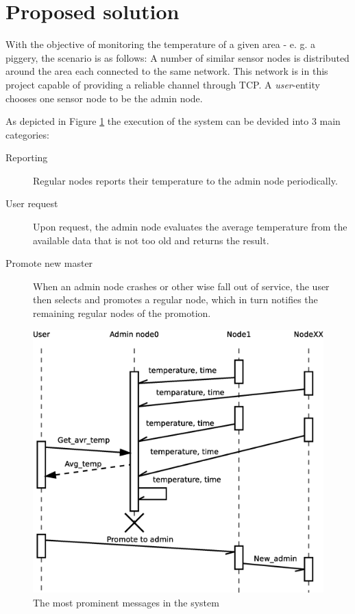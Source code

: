 \section{Proposed solution}
\label{sec:proposedsolution}
With the objective of monitoring the temperature of a given area - e. g. a piggery, the scenario is as follows: A number of similar sensor nodes is distributed around the area each connected to the same network. This network is in this project capable of providing a reliable channel through TCP. A \textit{user}-entity chooses one sensor node to be the admin node. 

As depicted in Figure \ref{fig:overview} the execution of the system can be devided into 3 main categories:
\begin{description}
    \item[Reporting] Regular nodes reports their temperature to the admin node periodically.
    \item[User request] Upon request, the admin node evaluates the average temperature from the available data that is not too old and returns the result.
    \item[Promote new master] When an admin node crashes or other wise fall out of service, the user then selects and promotes a regular node, which in turn notifies the remaining regular nodes of the promotion.
\end{description}
\begin{figure}[ht!]
\centering
    \includegraphics[scale=0.4]{eps/communications2}
\caption{The most prominent messages in the system}
\label{fig:overview}
\end{figure}

